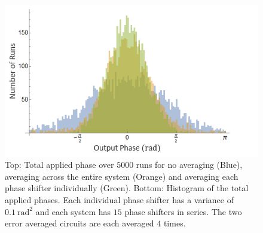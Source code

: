 \documentclass[aps,pra,twocolumn,superscriptaddress,numerical]{revtex4-1}
\begin{document}
		\begin{figure}
			\begin{centering}
				\includegraphics[width=\columnwidth]{totPhase1.png}
				\par\end{centering}
			
			\caption[Statistical simulation of total applied phase for no correction, correcting across the system and correcting each element individually for a larger system. ]{Top: Total applied phase over $5000$ runs for no averaging (Blue), averaging across the entire system (Orange) and averaging each phase shifter individually (Green). Bottom: Histogram of the total applied phases. Each individual phase shifter has a variance of $0.1\ \textrm{rad}^{2}$ and each system has $15$ phase shifters in series. The two error averaged circuits are each averaged $4$ times. \label{fig:Total-applied-phase1}}
		\end{figure}
		
\end{document}
